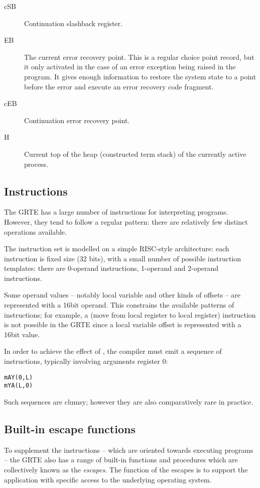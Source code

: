 \begin{description}
\item[cSB]
Continuation slashback register.
\item[EB]
The current error recovery point. This is a regular choice point record, but it only activated in the case of an error exception being raised in the program. It gives enough information to restore the system state to a point before the error and execute an error recovery code fragment.
\item[cEB]
Continuation error recovery point.
\item[H]
Current top of the heap (constructed term stack) of the currently active process.
\end{description}

\subsection{Instructions}
\label{howitworks:instructions}

The GRTE has a large number of instructions for interpreting \go programs. However, they tend to follow a regular pattern: there are relatively few distinct operations available.

The instruction set is modelled on a simple RISC-style architecture: each instruction is fixed size (32 bits), with a small number of possible instruction templates: there are 0-operand instructions, 1-operand and 2-operand instructions.

Some operand values -- notably local variable and other kinds of offsets -- are represented with a 16bit operand. This constrains the available patterns of instructions; for example, a  (move from local register to local register) instruction is not possible in the GRTE since a local variable offset is represented with a 16bit value.

In order to achieve the effect of , the compiler must emit a sequence of instructions, typically involving arguments register 0:
\begin{alltt}
mAY(0,L)
mYA(L,0)
\end{alltt}
Such sequences are clumsy; however they are also comparatively rare in practice.



\subsection{Built-in escape functions}
\label{howitworks:escapes}

To supplement the instructions -- which are oriented towards executing \go programs -- the GRTE also has a range of built-in functions and procedures which are collectively known as the \emph{escapes}. The function of the escapes is to support the \go application with specific access to the underlying operating system.

